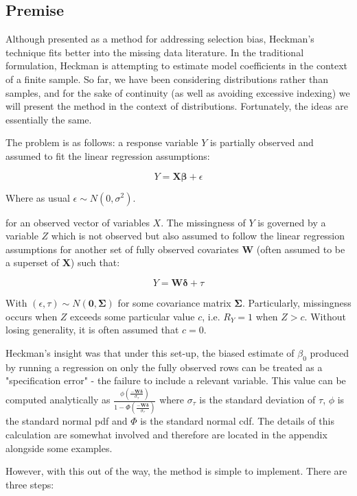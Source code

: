 \documentclass[12pt,twoside]{reedthesis}
\theoremstyle{definition}
\begin{document}
\subsection{Premise}

Although presented as a method for addressing selection bias, Heckman's technique fits better into the missing data literature. In the traditional formulation, Heckman is attempting to estimate model coefficients in the context of a finite sample. So far, we have been considering distributions rather than samples, and for the sake of continuity (as well as avoiding excessive indexing) we will present the method in the context of distributions. Fortunately, the ideas are essentially the same.

The problem is as follows: a response variable $Y$ is partially observed and assumed to fit the linear regression assumptions:

$$Y = \mathbf{X} \boldsymbol{\beta} + \epsilon$$

Where as usual $\epsilon \sim N(0, \sigma^2)$.

 for an observed vector of variables $X$. The missingness of $Y$ is governed by a variable $Z$ which is not observed but also assumed to follow the linear regression assumptions for another  set of fully observed covariates $\mathbf{W}$ (often assumed to be a superset of $\mathbf{X}$) such that:
 
$$Y = \mathbf{W} \boldsymbol{\delta} + \tau$$

With $(\epsilon, \tau) \sim N(\mathbf{0}, \boldsymbol{\Sigma})$ for some covariance matrix $\boldsymbol{\Sigma}$.  Particularly, missingness occurs when $Z$ exceeds some particular value $c$, i.e. $R_Y = 1$ when $Z > c$. Without losing generality, it is often assumed that $c = 0$. 

Heckman's insight was that under this set-up, the biased estimate of $\beta_0$ produced by running a regression on only the fully observed rows can be treated as a "specification error" - the failure to include a relevant variable. This value can be computed analytically as $\frac{\phi(\frac{-\mathbf{W} \boldsymbol{\delta}}{\sigma_\tau})}{1 - \Phi(\frac{-\mathbf{W} \boldsymbol{\delta}}{\sigma_\tau})}$ where $\sigma_\tau$ is the standard deviation of $\tau$, $\phi$ is the standard normal pdf and $\Phi$ is the standard normal cdf. The details of this calculation are somewhat involved and therefore are located in the appendix alongside some examples. 

However, with this out of the way, the method is simple to implement. There are three steps:
\end{document}
